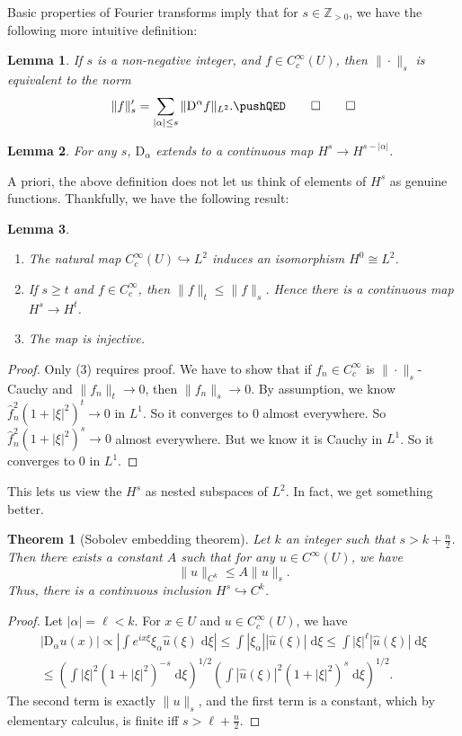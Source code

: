 \documentclass{shortart}
\newtheorem*{thm}{Theorem}
\newtheorem*{lemma}{Lemma}
\theoremstyle{definition}
\newcommand\Z{\mathbb{Z}}
\renewcommand\d{\mathrm{d}}
\newcommand\D{\mathrm{D}}
\begin{document}
Basic properties of Fourier transforms imply that for $s \in \Z_{>0}$, we have the following more intuitive definition:
\begin{lemma}
  If $s$ is a non-negative integer, and $f \in C_c^\infty(U)$, then $\|\cdot\|_s$ is equivalent to the norm
  \[
    \|f\|_s' = \sum_{|\alpha| \leq s} \|\mathrm{D}^\alpha f\|_{L^2}.\fakeqed
  \]
\end{lemma}
\begin{lemma}
  For any $s$, $\D_\alpha$ extends to a continuous map $H^s \to H^{s - |\alpha|}$.\fakeqed
\end{lemma}
A priori, the above definition does not let us think of elements of $H^s$ as genuine functions. Thankfully, we have the following result:
\begin{lemma}\leavevmode
  \begin{enumerate}
    \item The natural map $C_c^\infty(U) \hookrightarrow L^2$ induces an isomorphism $H^0 \cong L^2$.
    \item If $s \geq t$ and $f \in C_c^\infty$, then $\|f\|_t \leq \|f\|_s$. Hence there is a continuous map $H^s \to H^t$.
    \item The map is injective.
  \end{enumerate}
\end{lemma}

\begin{proof}
  Only (3) requires proof. We have to show that if $f_n \in C_c^\infty$ is $\|\cdot\|_s$-Cauchy and $\|f_n\|_t \to 0$, then $\|f_n\|_s \to 0$. By assumption, we know $\hat{f}_n^2(1 + |\xi|^2)^t \to 0$ in $L^1$. So it converges to $0$ almost everywhere. So $\hat{f}_n^2 (1 + |\xi|^2)^s \to 0$ almost everywhere. But we know it is Cauchy in $L^1$. So it converges to $0$ in $L^1$.
\end{proof}

This lets us view the $H^s$ as nested subspaces of $L^2$. In fact, we get something better.
\begin{thm}[Sobolev embedding theorem]
  Let $k$ an integer such that $s > k + \frac{n}{2}$. Then there exists a constant $A$ such that for any $u \in C^{\infty}(U)$, we have
  \[
    \|u\|_{C^k} \leq A \|u\|_s.
  \]
  Thus, there is a continuous inclusion $H^s \hookrightarrow C^k$.
\end{thm}
\begin{proof}
  Let $|\alpha| = \ell < k$. For $x \in U$ and $u \in C^\infty_c(U)$, we have
  \begin{multline*}
    |\D_\alpha u(x)| \propto \left| \int e^{ix\xi} \xi_\alpha \hat{u}(\xi) \;\d \xi\right| \leq \int |\xi_\alpha| |\hat{u}(\xi)| \;\d \xi \leq \int |\xi|^\ell |\hat{u}(\xi)|\;\d \xi \\
    \leq \left(\int |\xi|^2 (1 + |\xi|^2)^{-s}\;\d \xi\right)^{1/2}\left(\int |\hat{u}(\xi)|^2 (1 + |\xi|^2)^s\;\d \xi\right)^{1/2}.
  \end{multline*}
  The second term is exactly $\|u\|_s$, and the first term is a constant, which by elementary calculus, is finite iff $s > \ell + \frac{n}{2}$.
\end{proof}
\end{document}
